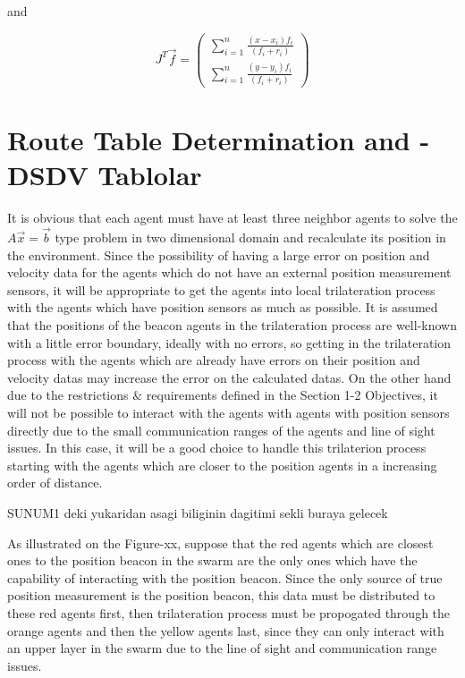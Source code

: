 \documentclass[twoside]{article}
\begin{document}
\begin{multicols}{2}
and 

\begin{equation}
  J^T\vec{f} = \left(\begin{matrix}
 \sum_{i=1}^{n}\frac{(x-x_i)f_i}{(f_i+r_i)} \\
  \sum_{i=1}^{n}\frac{(y-y_i)f_i}{(f_i+r_i)}
  \end{matrix}\right)
\end{equation}
	
	
	\section{ Route Table Determination and - DSDV Tablolar}
	
	It is obvious that each agent must have at least three neighbor agents to solve the $A\vec{x}=\vec{b}$ type problem in two dimensional domain and recalculate its position in the environment. Since the possibility of having a large error on position and velocity data for the agents which do not have an external position measurement sensors, it will be appropriate to get the agents into local trilateration process with the agents which have position sensors as much as possible. It is assumed that the positions of the beacon agents in the trilateration process are well-known with a little error boundary, ideally with no errors, so getting in the trilateration process with the agents which are already have errors on their position and velocity datas may increase the error on the calculated datas. On the other hand due to the restrictions $\&$ requirements defined in the Section 1-2 Objectives, it will not be possible to interact with the agents with agents with position sensors directly due to the small communication ranges of the agents and line of sight issues. In this case, it will be a good choice to handle this trilaterion process starting with the agents which are closer to the position agents in a increasing order of distance. 
	
	SUNUM1 deki yukaridan asagi biliginin dagitimi sekli buraya gelecek
	
	As illustrated on the Figure-xx, suppose that the red agents which are closest ones to the position beacon in the swarm are the only ones which have the capability of interacting with the position beacon. Since the only source of true position measurement is the position beacon, this data must be distributed to these red agents first, then trilateration process must be propogated through the orange agents and then the yellow agents last, since they can only interact with an upper layer in the swarm due to the line of sight and communication range issues.
	

\end{multicols}
\end{document}
